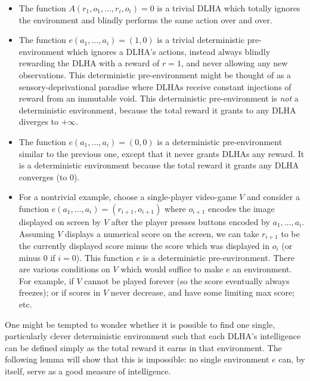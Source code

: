 \documentclass[twoside,11pt]{article}
\begin{document}
\begin{example}
    \begin{itemize}
        \item The function $A(r_1,o_1,\ldots,r_i,o_i)=0$ is a trivial DLHA which
        totally ignores the environment and blindly performs the same action
        over and over.
        \item The function $e(a_1,\ldots,a_i)=(1,0)$ is a trivial deterministic pre-environment
        which ignores a DLHA's actions, instead always blindly rewarding the DLHA
        with a reward of $r=1$, and never allowing any new observations. This
        deterministic pre-environment might be thought of as a sensory-deprivational paradise
        where DLHAs receive constant injections of reward from an immutable void.
        This deterministic pre-environment
        is \emph{not} a deterministic environment, because the total reward
        it grants to any DLHA diverges to $+\infty$.
        \item The function $e(a_1,\ldots,a_i)=(0,0)$ is a deterministic
        pre-environment similar to
        the previous one, except that it never grants DLHAs any reward. It is a
        deterministic environment because the total reward it grants
        any DLHA converges (to $0$).
        \item For a nontrivial example, choose a single-player video-game $V$ and 
        consider a function $e(a_1,\ldots,a_i)=(r_{i+1},o_{i+1})$
        where $o_{i+1}$ encodes the image displayed on screen
        by $V$ after the player presses buttons encoded by $a_1,\ldots,a_i$.
        Assuming $V$ displays a numerical score on the screen,
        we can take $r_{i+1}$ to be the currently displayed score minus the score which was
        displayed in $o_i$ (or minus $0$
        if $i=0$). This function $e$ is a deterministic pre-environment. There are various
        conditions on $V$ which would suffice to make $e$ an environment. For example,
        if $V$ cannot be played forever (so the score eventually always freezes);
        or if scores in $V$ never decrease, and have some limiting max score;
        etc.
    \end{itemize}
\end{example}

One might be tempted to wonder whether it is possible to find one single, particularly
clever deterministic environment such that each DLHA's intelligence can be defined
simply as the total reward it earns in that environment. The following lemma will show
that this is impossible: no single environment $e$ can, by itself, serve as a good
measure of intelligence.
\end{document}
